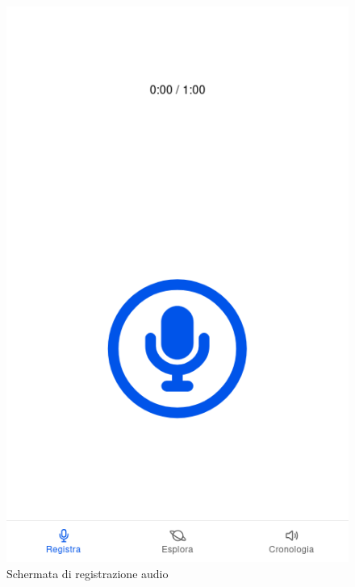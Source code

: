 \documentclass{article}
\begin{document}
\begin{figure}[H]
    \begin{minipage}{0.30\textwidth}
        \includegraphics[width=\linewidth]{record.png}
        \centering
        \caption{Schermata di registrazione audio}
        \label{fig:record}
    \end{minipage} \hfill
    \begin{minipage}{0.30\textwidth}

\end{minipage}
\end{figure}
\end{document}
